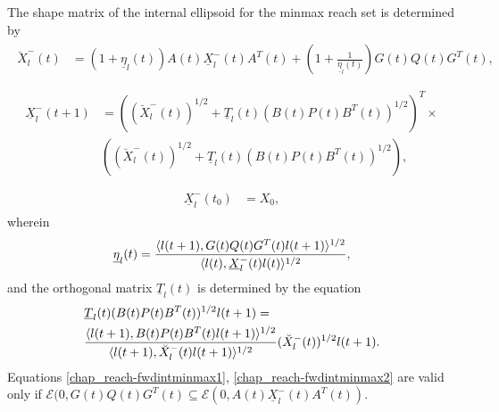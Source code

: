 \documentclass[letterpaper,10pt,english]{sphinxmanual}
\begin{document}
The shape matrix of the internal ellipsoid for the minmax reach set is
determined by
\label{chap_reach:equation-fwdintminmax1}\begin{gather}
\begin{split}\breve{X}^-_l(t) & = (1+\underline{\eta}_l(t))A(t)\underline{X}^-_l(t)A^T(t) +
\left(1+\frac{1}{\underline{\eta}_l(t)}\right)
G(t)Q(t)G^T(t),\\\end{split}\label{chap_reach-fwdintminmax1}
\end{gather}\label{chap_reach:equation-fwdintminmax2}\begin{gather}
\begin{split}\underline{X}^-_l(t+1) & = \left((\breve{X}^-_l(t))^{1/2} +
\underline{T}_l(t)(B(t)P(t)B^T(t))^{1/2}\right)^T
\times \nonumber \\
&\left((\breve{X}^-_l(t))^{1/2} + \underline{T}_l(t)(B(t)P(t)B^T(t))^{1/2}\right),\\\end{split}\label{chap_reach-fwdintminmax2}
\end{gather}\label{chap_reach:equation-fwdintminmax3}\begin{gather}
\begin{split}\underline{X}^-_l(t_0) & = X_0,\end{split}\label{chap_reach-fwdintminmax3}
\end{gather}
wherein
\begin{gather}
\begin{split}\underline{\eta}_l(t) = \frac{\langle l(t+1),
G(t)Q(t)G^T(t)l(t+1)\rangle^{1/2}}{\langle l(t),
\underline{X}^-_l(t)l(t)\rangle^{1/2}},\end{split}\notag
\end{gather}
and the orthogonal matrix $\underline{T}_l(t)$ is determined by
the equation
\begin{gather}
\begin{split}\begin{aligned}
&\underline{T}_l(t)(B(t)P(t)B^T(t))^{1/2}l(t+1) = \\
& \frac{\langle l(t+1),
B(t)P(t)B^T(t)l(t+1)\rangle^{1/2}}{\langle l(t+1),
\breve{X}^-_l(t)l(t+1)\rangle^{1/2}}(\breve{X}^-_l(t))^{1/2}l(t+1).\end{aligned}\end{split}\notag
\end{gather}
Equations \eqref{chap_reach-fwdintminmax1}, \eqref{chap_reach-fwdintminmax2} are valid only if
${\mathcal E}(0,G(t)Q(t)G^T(t)\subseteq{\mathcal E}(0,A(t)\underline{X}^-_l(t)A^T(t))$.
\end{document}
